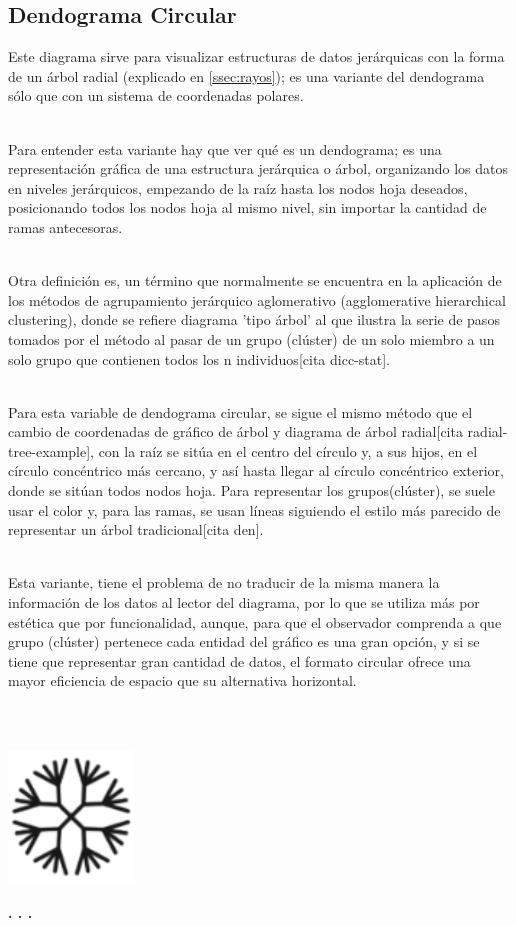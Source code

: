 \documentclass{article}\usepackage[]{graphicx}\usepackage[]{color}
\begin{document}
\subsection{Dendograma Circular}
Este diagrama sirve para visualizar estructuras de datos jer\'arquicas con la forma de un \'arbol radial (explicado en \ref{ssec:rayos}); es una variante del dendograma s\'olo que con un sistema de coordenadas polares.~\\~\par
Para entender esta variante hay que ver qu\'e es un dendograma; es una representaci\'on gr\'afica de una estructura jer\'arquica o \'arbol, organizando los datos en niveles jer\'arquicos, empezando de la ra\'iz hasta los nodos hoja deseados, posicionando todos los nodos hoja al mismo nivel, sin importar la cantidad de ramas antecesoras.~\\~\par
Otra definici\'on es, un t\'ermino que normalmente se encuentra en la aplicaci\'on de los m\'etodos de agrupamiento jer\'arquico aglomerativo (agglomerative hierarchical clustering), donde se refiere diagrama 'tipo \'arbol' al que ilustra la serie de pasos tomados por el m\'etodo al pasar de un grupo (cl\'uster) de un solo miembro a un solo grupo que contienen todos los n individuos[cita dicc-stat].~\\~\par
\clearpage
Para esta variable de dendograma circular,  se sigue el mismo m\'etodo que el cambio de coordenadas de gr\'afico de \'arbol y diagrama de \'arbol radial[cita radial-tree-example], con la ra\'iz se sit\'ua en el centro del c\'irculo y, a sus hijos, en el c\'irculo conc\'entrico m\'as cercano, y as\'i hasta llegar al c\'irculo conc\'entrico exterior, donde se sit\'uan todos nodos hoja. Para representar los grupos(cl\'uster), se suele usar el color y, para las ramas, se usan l\'ineas siguiendo el estilo m\'as parecido de representar un \'arbol tradicional[cita den].~\\~\par
Esta variante, tiene el problema de no traducir de la misma manera la informaci\'on de los datos al lector del diagrama, por lo que se utiliza m\'as por est\'etica que por funcionalidad, aunque, para que el observador comprenda a que grupo (cl\'uster) pertenece cada entidad del gr\'afico es una gran opci\'on, y si se tiene que representar gran cantidad de datos, el formato circular ofrece una mayor eficiencia de espacio que su alternativa horizontal.
~\\~\\~\\~\\
\vbox{
    \centering
    \includegraphics[width=0.25\textwidth]{imag/dendo}
}
\begin{center}
\textbf{. . .}
\end{center}
~\\~\\
\end{document}
